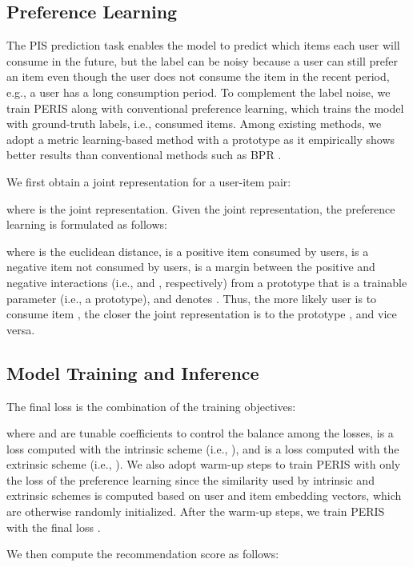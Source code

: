 \documentclass[sigconf]{acmart}
\newcommand{\MD}{{\small\textsf{PERIS}}}
\begin{document}
\subsection{Preference Learning}
\label{sec:pref}
The PIS prediction task enables the model to predict which items each user will consume in the future, but the label  can be noisy because a user can still prefer an item even though the user does not consume the item in the recent period, e.g., a user has a long consumption period. To complement the label noise, we train \MD{} along with conventional preference learning, which trains the model with ground-truth labels, i.e., consumed items. 
Among existing methods, we adopt a metric learning-based method with a prototype \cite{movshovitz2017no, hyun2020interest} as it empirically shows better results than conventional methods such as BPR \cite{mnih2008probabilistic}.


We first obtain a joint representation for a user-item pair:

where  is the joint representation. Given the joint representation, the preference learning is formulated as follows:

where  is the euclidean distance,  is a positive item consumed by users,  is a negative item not consumed by users,  is a margin between the positive and negative interactions (i.e.,  and , respectively) from a prototype  that is a trainable parameter (i.e., a prototype), and  denotes . 
Thus, the more likely user  is to consume item , the closer the joint representation  is to the prototype , and vice versa.



\subsection{Model Training and Inference}
\label{sec:loss}
The final loss is the combination of the training objectives:

where  and   are tunable coefficients to control the balance among the losses,  is a loss computed with the intrinsic scheme (i.e., ), and  is a loss computed with the extrinsic scheme (i.e., ).
We also adopt warm-up steps to train \MD{} with only the loss of the preference learning  since the similarity used by intrinsic and extrinsic schemes is computed based on user and item embedding vectors, which are otherwise randomly initialized. After the warm-up steps, we train \MD{} with the final loss .

We then compute the recommendation score as follows:
\end{document}
